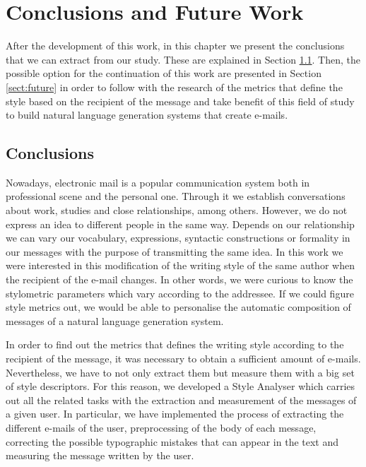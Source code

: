 \chapter{Conclusions and Future Work}
\label{cap:conclusiones}


After the development of this work, in this chapter we present the conclusions that we can extract from our study. These are explained in Section \ref{sect:conc}. Then, the possible option for the continuation of this work are presented in Section \ref{sect:future} in order to follow with the research of the metrics that define the style based on the recipient of the message and take benefit of this field of study to build natural language generation systems that create e-mails.

\section{Conclusions}\label{sect:conc}
Nowadays, electronic mail is a popular communication system both in professional scene and the personal one. Through it we establish conversations about work, studies and close relationships, among others. However, we do not express an idea to different people in the same way. Depends on our relationship we can vary our vocabulary, expressions, syntactic constructions or formality in our messages with the purpose of transmitting the same idea. In this work we were interested in this modification of the writing style of the same author when the recipient of the e-mail changes. In other words, we were curious to know the stylometric parameters which vary according to the addressee. If we could figure  style metrics out, we would be able to personalise the automatic composition of messages of a natural language generation system.

In order to find out the metrics that defines the writing style according to the recipient of the message, it was necessary to obtain a sufficient amount of e-mails. Nevertheless, we have to not only extract them but measure them with a big set of style descriptors. For this reason, we developed a Style Analyser which carries out all the related tasks with the extraction and measurement of the messages of a given user. In particular, we have implemented the process of extracting the different e-mails of the user, preprocessing of the body of each message, correcting the possible typographic mistakes that can appear in the text and measuring the message written by the user.

